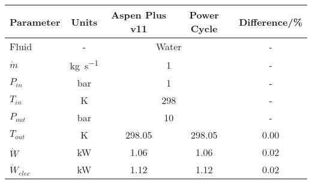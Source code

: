 \begin{tabular}{|p{2.5cm} c c c c|}
    \hline
    \rowcolor{bluepoli!40} %
    \textbf{Parameter} & \textbf{Units} & \textbf{Aspen Plus v11} & \textbf{Power Cycle} & \textbf{Difference/\unit{\percent}} \T\B \\
    \hline \hline
    Fluid & - & \multicolumn{2}{c}{Water} & - \T\B\\
    \(\Dot{m}\)  & \unit{\kg\per\s} & \multicolumn{2}{c}{\num{1}} & - \T\B\\
    \(P_{in}\) & \unit{\bar} & \multicolumn{2}{c}{\num{1}} & - \T\B\\
    \(T_{in}\) & \unit{\K} & \multicolumn{2}{c}{\num{298}} & - \T\B\\
    \(P_{out}\) & \unit{\bar} & \multicolumn{2}{c}{\num{10}} & - \T\B\\
    \hline\hline
    \(T_{out}\) & \unit{\K} & 298.05 & 298.05 & 0.00 \T\B\\
    \(\Dot{W}\) & \unit{\kilo\watt} & 1.06 & 1.06 & 0.02 \T\B\\
    \(\Dot{W}_{elec}\) & \unit{\kilo\watt} & 1.12 & 1.12 & 0.02 \T\B\\
    \hline
\end{tabular}